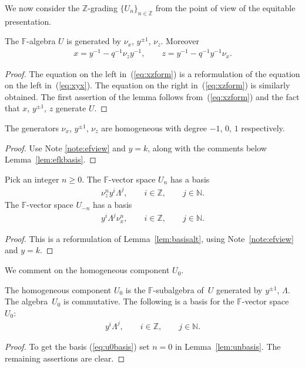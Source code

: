  We now consider the $\mathbb Z$-grading
$\lbrace U_n\rbrace_{n\in \mathbb Z}$ from the point
of view of the equitable presentation.


\begin{Lemma}
\label{lem:gensetu}
The $\mathbb F$-algebra $U$ is generated by
$\nu_x$, $y^{\pm 1}$, $\nu_z$. Moreover
\begin{gather}
x = y^{-1}- q^{-1}\nu_z y^{-1},
\qquad
z = y^{-1}- q^{-1}y^{-1} \nu_x.
\label{eq:xzform}
\end{gather}
\end{Lemma}

\begin{proof}
The equation
on the left
in~(\ref{eq:xzform})
is a reformulation of
the equation on the left
in~(\ref{eq:xyx}).
The equation on the right in~(\ref{eq:xzform}) is similarly obtained.
The f\/irst assertion of the lemma follows
from~(\ref{eq:xzform}) and the fact that
$x$, $y^{\pm 1}$, $z$ generate
$U$.
\end{proof}


\begin{Lemma}
\label{lem:weightlist}
The generators
$\nu_x$, $y^{\pm 1}$, $\nu_z$ are homogeneous
with degree $-1$, $0$, $1$ respectively.
\end{Lemma}
\begin{proof}
Use Note
\ref{note:efview} and $y=k$, along with
 the comments below
Lemma~\ref{lem:efkbasis}.
\end{proof}

\begin{Lemma}
\label{lem:unbasis}
Pick an integer $n\geq 0$.
The $\mathbb F$-vector space $U_n$ has a basis
\begin{gather*}
\nu^n_z  y^i \Lambda^j,
  \qquad i\in \mathbb Z, \qquad j\in \mathbb N.
\end{gather*}
The $\mathbb F$-vector space $U_{-n}$ has a basis
\begin{gather*}
y^i \Lambda^j \nu^n_x,
 \qquad i\in \mathbb Z, \qquad j\in \mathbb N.
\end{gather*}
\end{Lemma}
\begin{proof}
This is a reformulation of
Lemma~\ref{lem:basisalt}, using
Note~\ref{note:efview} and $y=k$.
\end{proof}


 We comment on the homogeneous component
$U_0$.

\begin{Lemma}
\label{lem:u0facts}
The homogeneous component
$U_0$ is the $\mathbb F$-subalgebra
of~$U$ generated by
$y^{\pm 1}$,
$\Lambda $.
The algebra~$U_0$
is commutative.
The following is a basis for the
$\mathbb F$-vector space~$U_0$:
\begin{gather}
\label{eq:u0basis}
 y^i \Lambda^j,
  \qquad i\in \mathbb Z, \qquad    j\in \mathbb N.
\end{gather}
\end{Lemma}
\begin{proof}
To get the basis
(\ref{eq:u0basis}) set $n=0$ in
Lemma~\ref{lem:unbasis}. The remaining assertions
are clear.
\end{proof}

